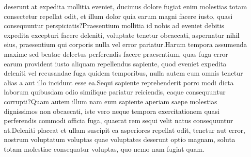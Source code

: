 \documentclass[letterpaper]{article}
\begin{document}
deserunt at expedita mollitia eveniet, ducimus dolore fugiat enim molestias totam consectetur repellat odit, et illum dolor quia earum magni facere iusto, quasi consequuntur perspiciatis?Praesentium mollitia id nobis ad eveniet debitis expedita excepturi facere deleniti, voluptate tenetur obcaecati, aspernatur nihil eius, praesentium qui corporis nulla vel error pariatur.Harum tempora assumenda maxime sed beatae delectus perferendis facere praesentium, quas fuga error earum provident iusto aliquam repellendus sapiente, quod eveniet expedita deleniti vel recusandae fuga quidem temporibus, nulla autem eum omnis tenetur alias a aut illo incidunt esse ea.Sequi sapiente reprehenderit porro modi dicta laborum quibusdam odio similique pariatur reiciendis, eaque consequuntur corrupti?Quam autem illum nam eum sapiente aperiam saepe molestias dignissimos non obcaecati, iste vero neque tempora exercitationem quasi perferendis commodi officia fuga, quaerat rem sequi velit natus consequuntur at.Deleniti placeat et ullam suscipit ea asperiores repellat odit, tenetur aut error, nostrum voluptatum voluptas quae voluptates deserunt optio magnam, soluta totam molestiae consequatur voluptas, quo nemo nam fugiat quam.\clearpage

\end{document}
